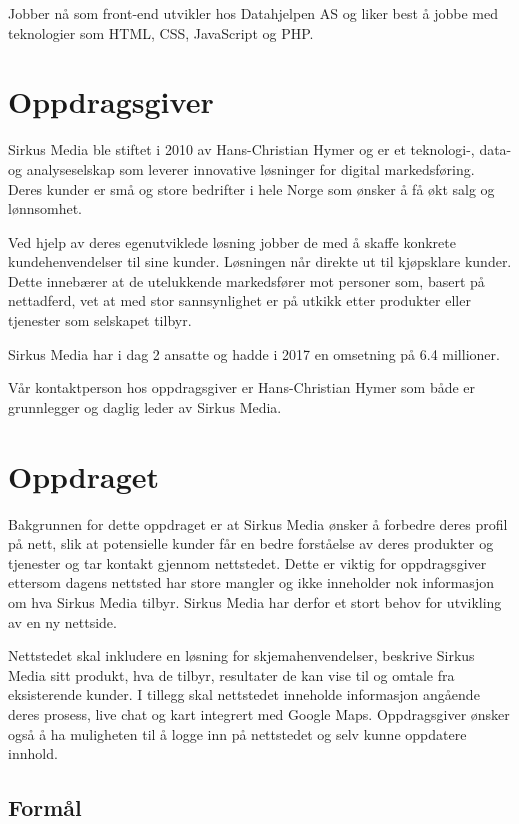 \documentclass[11pt,a4paper]{report}
\begin{document}
Jobber nå som front-end utvikler hos Datahjelpen AS og liker best å jobbe med teknologier som HTML, CSS, JavaScript og PHP.

\section*{Oppdragsgiver}

Sirkus Media ble stiftet i 2010 av Hans-Christian Hymer og er et teknologi-, data- og analyseselskap som leverer innovative løsninger for digital markedsføring. Deres kunder er små og store bedrifter i hele Norge som ønsker å få økt salg og lønnsomhet. 

Ved hjelp av deres egenutviklede løsning jobber de med å skaffe konkrete kundehenvendelser til sine kunder. Løsningen når direkte ut til kjøpsklare kunder. Dette innebærer at de utelukkende markedsfører mot personer som, basert på nettadferd, vet at med stor sannsynlighet er på utkikk etter produkter eller tjenester som selskapet tilbyr.

Sirkus Media har i dag 2 ansatte og hadde i 2017 en omsetning på 6.4 millioner.

Vår kontaktperson hos oppdragsgiver er Hans-Christian Hymer som både er grunnlegger og daglig leder av Sirkus Media. 

\section*{Oppdraget}

Bakgrunnen for dette oppdraget er at Sirkus Media ønsker å forbedre deres profil på nett, slik at potensielle kunder får en bedre forståelse av deres produkter og tjenester og tar kontakt gjennom nettstedet. Dette er viktig for oppdragsgiver ettersom dagens nettsted har store mangler og ikke inneholder nok informasjon om hva Sirkus Media tilbyr. Sirkus Media har derfor et stort behov for utvikling av en ny nettside. 

Nettstedet skal inkludere en løsning for skjemahenvendelser, beskrive Sirkus Media sitt produkt, hva de tilbyr, resultater de kan vise til og omtale fra eksisterende kunder.
I tillegg skal nettstedet inneholde informasjon angående deres prosess, live chat og kart integrert med Google Maps. Oppdragsgiver ønsker også å ha muligheten til å logge inn på nettstedet og selv kunne oppdatere innhold.

\subsection*{Formål}
\end{document}
